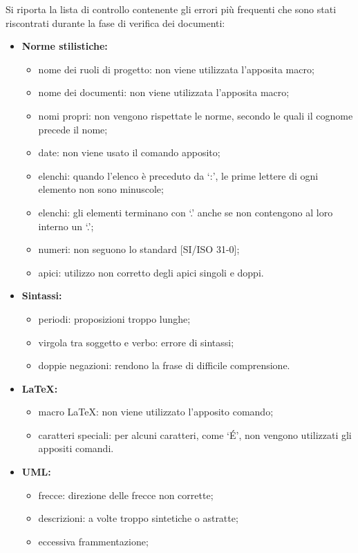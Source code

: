 Si riporta la lista di controllo contenente gli errori più frequenti che sono stati riscontrati durante la fase di verifica dei documenti:
\begin{itemize}
	\item \textbf{Norme stilistiche:}
	\begin{itemize}
		\item nome dei ruoli di progetto: non viene utilizzata l'apposita macro;
		\item nome dei documenti: non viene utilizzata l'apposita macro;
		\item nomi propri: non vengono rispettate le norme, secondo le quali il cognome precede il nome;
		\item date: non viene usato il comando apposito;
		\item elenchi: quando l'elenco è preceduto da ‘:’, le prime lettere di ogni elemento non sono minuscole;
		\item elenchi: gli elementi terminano con ‘.’ anche se non contengono al loro interno un ‘.’;
		\item numeri: non seguono lo standard [SI/ISO 31-0];
		\item apici: utilizzo non corretto degli apici singoli e doppi.
	\end{itemize}
	\item \textbf{Sintassi:}
	\begin{itemize}
		\item periodi: proposizioni troppo lunghe;
		\item virgola tra soggetto e verbo: errore di sintassi;
		\item doppie negazioni: rendono la frase di difficile comprensione.
	\end{itemize}
	\item \textbf{\LaTeX{}:}
	\begin{itemize}
		\item macro \LaTeX{}: non viene utilizzato l'apposito comando;
		\item caratteri speciali: per alcuni caratteri, come ‘\'{E}’, non vengono utilizzati gli appositi comandi.
	\end{itemize}
	\item \textbf{UML:}
	\begin{itemize}
		\item frecce: direzione delle frecce non corrette;
		\item descrizioni: a volte troppo sintetiche o astratte;
		\item eccessiva frammentazione;

\end{itemize}
\end{itemize}

